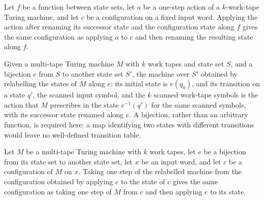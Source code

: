\begin{lemma}
\label{Turing.Cfg.mapState_apply}
\leanok
{}
Let $f$ be a function between state sets, let $a$ be a one-step action of a
$k$-work-tape Turing machine, and let $c$ be a configuration on a fixed input word.
Applying the action after renaming its successor state and the configuration state along
$f$ gives the same configuration as applying $a$ to $c$ and then renaming the resulting
state along $f$.
\end{lemma}

\begin{definition}
\label{Turing.MultiTapeTM.relabelState}
\leanok
{}
Given a multi-tape Turing machine $M$ with $k$ work tapes and state set $S$,
and a bijection $e$ from $S$ to another state set $S'$, the machine over $S'$
obtained by relabelling the states of $M$ along $e$: its initial state is
$e(q_0)$, and its transition on a state $q'$, the scanned input symbol, and
the $k$ scanned work-tape symbols is the action that $M$ prescribes in the
state $e^{-1}(q')$ for the same scanned symbols, with its successor state
renamed along $e$.  A bijection, rather than an arbitrary function, is
required here: a map identifying two states with different transitions would
leave no well-defined transition table.
\end{definition}

\begin{lemma}
\label{Turing.MultiTapeTM.relabelState_step}
\leanok
{}
Let $M$ be a multi-tape Turing machine with $k$ work tapes, let $e$ be a bijection from
its state set to another state set, let $x$ be an input word, and let $c$ be a
configuration of $M$ on $x$. Taking one step of the relabelled machine from the
configuration obtained by applying $e$ to the state of $c$ gives the same configuration
as taking one step of $M$ from $c$ and then applying $e$ to its state.
\end{lemma}

